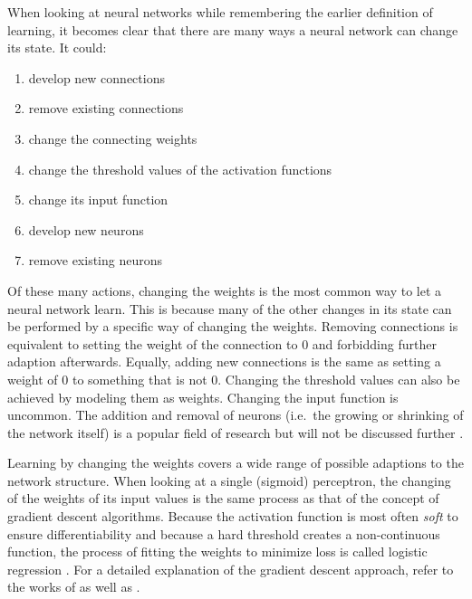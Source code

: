 When looking at neural networks while remembering the earlier definition of learning, it becomes clear that there are many
ways a neural network can change its state. It could:

\begin{enumerate}
    \item develop new connections
    \item remove existing connections
    \item change the connecting weights
    \item change the threshold values of the activation functions
    \item change its input function
    \item develop new neurons
    \item remove existing neurons \cite[p.60]{kriesel2007brief}
\end{enumerate}

\noindent Of these many actions, changing the weights is the most common way to let a neural network learn. This is because many
of the other changes in its state can be performed by a specific way of changing the weights. Removing connections is
equivalent to setting the weight of the connection to 0 and forbidding further adaption afterwards. Equally, adding new
connections is the same as setting a weight of 0 to something that is not 0. Changing the threshold values can also be
achieved by modeling them as weights. Changing the input function is uncommon. The addition and removal of neurons
(i.e.\ the growing or shrinking of the network itself) is a popular field of research but will not be discussed further
\cite[p.60]{kriesel2007brief}.

Learning by changing the weights covers a wide range of possible adaptions to the network structure. When
looking at a single (sigmoid) perceptron, the changing of the weights of its input values is the same process as that of the
concept of gradient descent algorithms. Because the activation function is most often \emph{soft} to ensure
differentiability and because a hard threshold creates a non-continuous function, the process of fitting the weights to
minimize loss is called logistic regression \cite[p.729f.]{russell2016artificial}. For a detailed explanation of the gradient
descent approach, refer to the works of \citet{russell2016artificial} as well as
\citet{Goodfellow-et-al-2016}.




